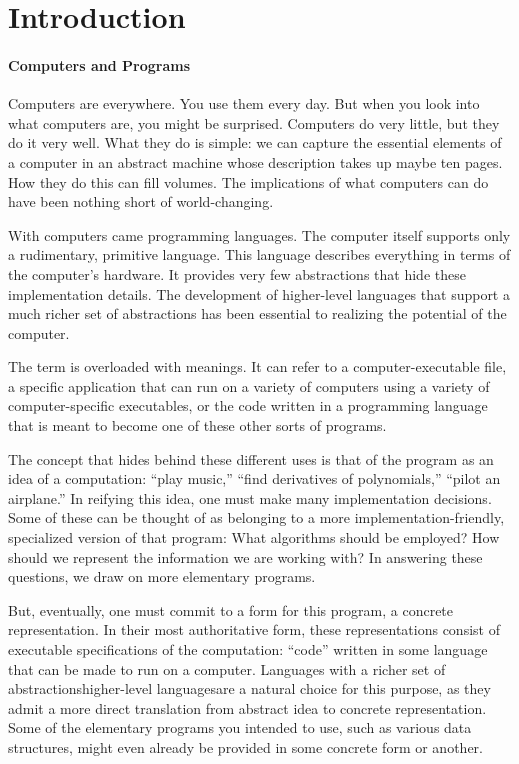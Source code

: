 \chapter*{Introduction}\label{introduction:introduction}
\subsubsection*{Computers and Programs}
Computers are everywhere. You use them every day. But when you look into what computers are, you might be surprised. Computers do very little, but they do it very well. What they do is simple: we can capture the essential elements of a computer in an abstract machine whose description takes up maybe ten pages. How they do this can fill volumes. The implications of what computers can do have been nothing short of world-changing.

With computers came programming languages. The computer itself supports only a rudimentary, primitive language. This language describes everything in terms of the computer's hardware. It provides very few abstractions that hide these implementation details. The development of higher-level languages that support a much richer set of abstractions has been essential to realizing the potential of the computer.

The term  is overloaded with meanings. It can refer to a computer-executable file, a specific application that can run on a variety of computers using a variety of computer-specific executables, or the code written in a programming language that is meant to become one of these other sorts of programs.

The concept that hides behind these different uses is that of the program as an idea of a computation: ``play music,'' ``find derivatives of polynomials,'' ``pilot an airplane.'' In reifying this idea, one must make many implementation decisions. Some of these can be thought of as belonging to a more implementation-friendly, specialized version of that program: What algorithms should be employed? How should we represent the information we are working with? In answering these questions, we draw on more elementary programs.

But, eventually, one must commit to a form for this program, a concrete representation. In their most authoritative form, these representations consist of executable specifications of the computation: ``code'' written in some language that can be made to run on a computer. Languages with a richer set of abstractions\empause higher-level languages\empause are a natural choice for this purpose, as they admit a more direct translation from abstract idea to concrete representation. Some of the elementary programs you intended to use, such as various data structures, might even already be provided in some concrete form or another.

